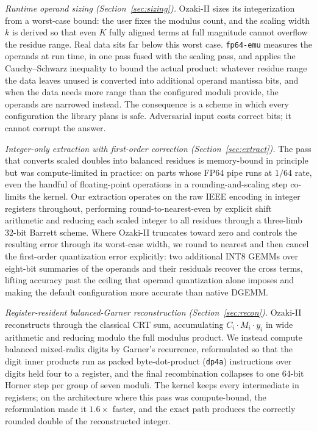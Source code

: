 \documentclass[11pt]{amsart}
\theoremstyle{plain}
\theoremstyle{definition}
\newcommand{\code}[1]{\texttt{#1}}
\newcommand{\fpemu}{\code{fp64-emu}}
\begin{document}
\emph{Runtime operand sizing (Section~\ref{sec:sizing}).} Ozaki-II sizes
its integerization from a worst-case bound: the user fixes the modulus
count, and the scaling width $k$ is derived so that even $K$ fully aligned
terms at full magnitude cannot overflow the residue range. Real data sits
far below this worst case. \fpemu{} measures the operands at run time, in
one pass fused with the scaling pass, and applies the Cauchy--Schwarz
inequality to bound the actual product: whatever residue range the data
leaves unused is converted into additional operand mantissa bits, and when
the data needs more range than the configured moduli provide, the operands
are narrowed instead. The consequence is a scheme in which every
configuration the library plans is safe. Adversarial input costs correct
bits; it cannot corrupt the answer.

\emph{Integer-only extraction with first-order correction
(Section~\ref{sec:extract}).} The pass that converts scaled doubles into
balanced residues is memory-bound in principle but was compute-limited in
practice: on parts whose FP64 pipe runs at $1/64$ rate, even the handful of
floating-point operations in a rounding-and-scaling step co-limits the
kernel. Our extraction operates on the raw IEEE encoding in integer
registers throughout, performing round-to-nearest-even by explicit shift
arithmetic and reducing each scaled integer to all residues through a
three-limb 32-bit Barrett scheme. Where Ozaki-II truncates toward zero and
controls the resulting error through its worst-case width, we round to
nearest and then cancel the first-order quantization error explicitly: two
additional INT8 GEMMs over eight-bit summaries of the operands and their
residuals recover the cross terms, lifting accuracy past the ceiling that
operand quantization alone imposes and making the default configuration
more accurate than native DGEMM.

\emph{Register-resident balanced-Garner reconstruction
(Section~\ref{sec:recon}).} Ozaki-II reconstructs through the classical CRT
sum, accumulating $C_i \cdot M_i \cdot y_i$ in wide arithmetic and reducing
modulo the full modulus product. We instead compute balanced mixed-radix
digits by Garner's recurrence, reformulated so that the digit inner
products run as packed byte-dot-product (\code{dp4a}) instructions over
digits held four to a register, and the final recombination collapses to
one 64-bit Horner step per group of seven moduli. The kernel keeps every
intermediate in registers; on the architecture where this pass was
compute-bound, the reformulation made it $1.6\times$ faster, and the exact
path produces the correctly rounded double of the reconstructed integer.
\end{document}
